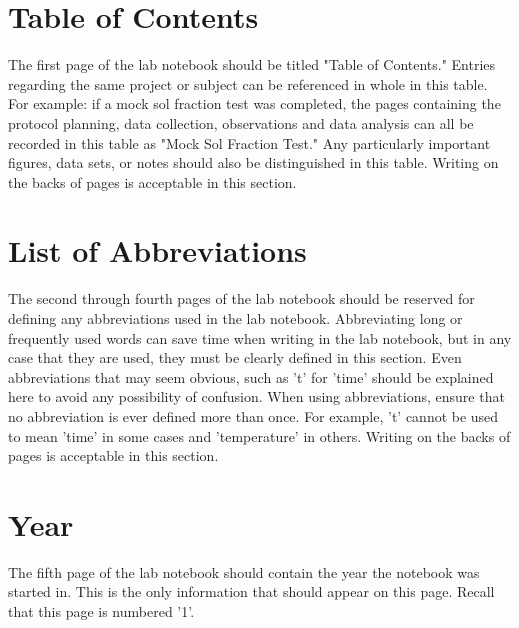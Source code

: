 \documentclass[11pt, oneside]{article}   	%
\begin{document}
							


\section{Table of Contents}

The first page of the lab notebook should be titled "Table of Contents." Entries regarding the same project or subject can be referenced in whole in this table. For example: if a mock sol fraction test was completed, the pages containing the protocol planning, data collection, observations and data analysis can all be recorded in this table as "Mock Sol Fraction Test." Any particularly important figures, data sets, or notes should also be distinguished in this table. Writing on the backs of pages is acceptable in this section.


\section{List of Abbreviations}

The second through fourth pages of the lab notebook should be reserved for defining any abbreviations used in the lab notebook. Abbreviating long or frequently used words can save time when writing in the lab notebook, but in any case that they are used, they must be clearly defined in this section. Even abbreviations that may seem obvious, such as 't' for 'time' should be explained here to avoid any possibility of confusion. When using abbreviations, ensure that no abbreviation is ever defined more than once. For example, 't' cannot be used to mean 'time' in some cases and 'temperature' in others. Writing on the backs of pages is acceptable in this section.


\section{Year}

The fifth page of the lab notebook should contain the year the notebook was started in. This is the only information that should appear on this page. Recall that this page is numbered '1'.
\end{document}
